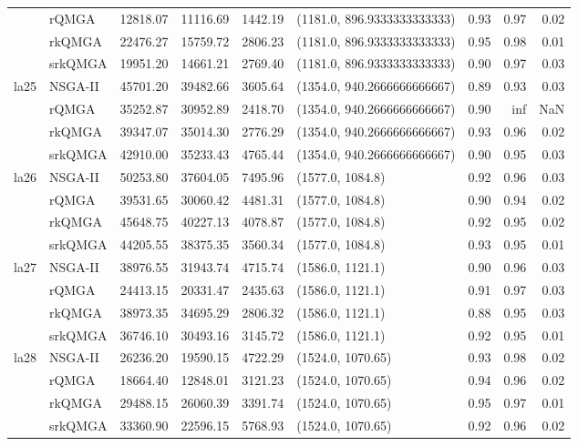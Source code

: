 \begin{tabular}{llrrrlrrr}
 & rQMGA & 12818.07 & 11116.69 & 1442.19 & (1181.0, 896.9333333333333) & 0.93 & 0.97 & 0.02 \\
 & rkQMGA & 22476.27 & 15759.72 & 2806.23 & (1181.0, 896.9333333333333) & 0.95 & 0.98 & 0.01 \\
 & srkQMGA & 19951.20 & 14661.21 & 2769.40 & (1181.0, 896.9333333333333) & 0.90 & 0.97 & 0.03 \\
\cline{1-9}
\multirow[t]{4}{*}{la25} & NSGA-II & 45701.20 & 39482.66 & 3605.64 & (1354.0, 940.2666666666667) & 0.89 & 0.93 & 0.03 \\
 & rQMGA & 35252.87 & 30952.89 & 2418.70 & (1354.0, 940.2666666666667) & 0.90 & inf & NaN \\
 & rkQMGA & 39347.07 & 35014.30 & 2776.29 & (1354.0, 940.2666666666667) & 0.93 & 0.96 & 0.02 \\
 & srkQMGA & 42910.00 & 35233.43 & 4765.44 & (1354.0, 940.2666666666667) & 0.90 & 0.95 & 0.03 \\
\cline{1-9}
\multirow[t]{4}{*}{la26} & NSGA-II & 50253.80 & 37604.05 & 7495.96 & (1577.0, 1084.8) & 0.92 & 0.96 & 0.03 \\
 & rQMGA & 39531.65 & 30060.42 & 4481.31 & (1577.0, 1084.8) & 0.90 & 0.94 & 0.02 \\
 & rkQMGA & 45648.75 & 40227.13 & 4078.87 & (1577.0, 1084.8) & 0.92 & 0.95 & 0.02 \\
 & srkQMGA & 44205.55 & 38375.35 & 3560.34 & (1577.0, 1084.8) & 0.93 & 0.95 & 0.01 \\
\cline{1-9}
\multirow[t]{4}{*}{la27} & NSGA-II & 38976.55 & 31943.74 & 4715.74 & (1586.0, 1121.1) & 0.90 & 0.96 & 0.03 \\
 & rQMGA & 24413.15 & 20331.47 & 2435.63 & (1586.0, 1121.1) & 0.91 & 0.97 & 0.03 \\
 & rkQMGA & 38973.35 & 34695.29 & 2806.32 & (1586.0, 1121.1) & 0.88 & 0.95 & 0.03 \\
 & srkQMGA & 36746.10 & 30493.16 & 3145.72 & (1586.0, 1121.1) & 0.92 & 0.95 & 0.01 \\
\cline{1-9}
\multirow[t]{4}{*}{la28} & NSGA-II & 26236.20 & 19590.15 & 4722.29 & (1524.0, 1070.65) & 0.93 & 0.98 & 0.02 \\
 & rQMGA & 18664.40 & 12848.01 & 3121.23 & (1524.0, 1070.65) & 0.94 & 0.96 & 0.02 \\
 & rkQMGA & 29488.15 & 26060.39 & 3391.74 & (1524.0, 1070.65) & 0.95 & 0.97 & 0.01 \\
 & srkQMGA & 33360.90 & 22596.15 & 5768.93 & (1524.0, 1070.65) & 0.92 & 0.96 & 0.02 \\

\end{tabular}
